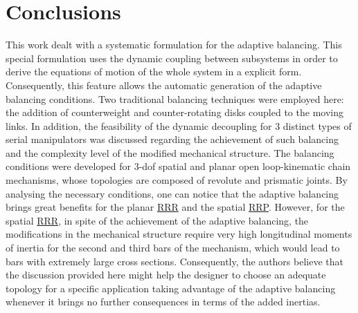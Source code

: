\documentclass[a4paper,11pt,brazil,fleqn]{article}
\begin{document}


\section{Conclusions}\label{S04}

This work dealt with a systematic formulation for the adaptive balancing. This special formulation uses the dynamic coupling between subsystems in order to derive the equations of motion of the whole system in a explicit form. Consequently, this feature allows the automatic generation of the adaptive balancing conditions. Two traditional balancing techniques were employed here: the addition of counterweight and counter-rotating disks coupled to the moving links. In addition, the feasibility of the dynamic decoupling for 3 distinct types of serial manipulators was discussed regarding the achievement of such balancing and the complexity level of the modified mechanical structure. The balancing conditions were developed for 3-dof spatial and planar open loop-kinematic chain mechanisms, whose topologies are composed of revolute and prismatic joints. By analysing the necessary conditions, one can notice that the adaptive balancing  brings great benefits for the planar \underline{RRR} and the spatial \underline{RRP}. However, for the spatial \underline{RRR}, in spite of the achievement of the adaptive balancing, the modifications in the mechanical structure require very high longitudinal moments of inertia for the second and third bars of the mechanism, which would lead to bars with extremely large cross sections. Consequently, the authors believe that the discussion provided here might help the designer to choose an adequate topology for a specific application taking advantage of the adaptive balancing whenever it brings no further consequences in terms of the added inertias.





{} 



\end{document}
